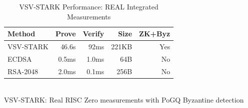 
\begin{table}[t]
\centering
\caption{VSV-STARK Performance: REAL Integrated Measurements}
\label{tab:vsv_stark_performance}
\begin{tabular}{lrrrr}
\toprule
\textbf{Method} & \textbf{Prove} & \textbf{Verify} & \textbf{Size} & \textbf{ZK+Byz} \\
\midrule
VSV-STARK & 46.6s & 92ms & 221KB & Yes \\
ECDSA & 0.5ms & 1.0ms & 64B & No \\
RSA-2048 & 2.0ms & 0.1ms & 256B & No \\
\bottomrule
\end{tabular}
\\[0.5em]
\footnotesize VSV-STARK: Real RISC Zero measurements with PoGQ Byzantine detection
\end{table}
